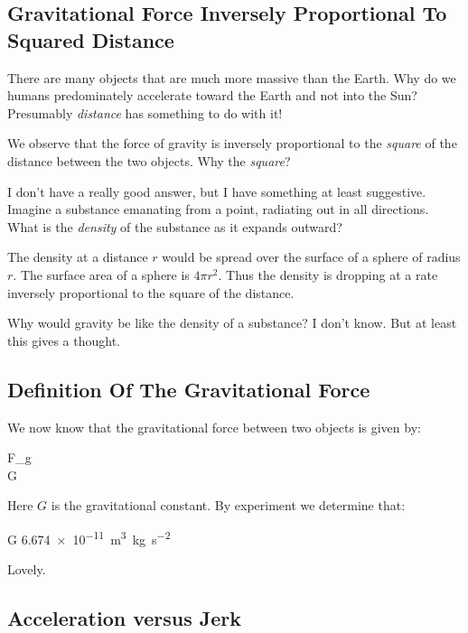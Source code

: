 \subsection{Gravitational Force Inversely Proportional To Squared Distance}

There are many objects that are much more massive than the Earth. Why do
we humans predominately accelerate toward the Earth and not into the
Sun? Presumably \emph{distance} has something to do with it!

We observe that the force of gravity is inversely proportional to the
\emph{square} of the distance between the two objects. Why the
\emph{square}?

I don't have a really good answer, but I have something at least
suggestive. Imagine a substance emanating from a point, radiating out in
all directions. What is the \emph{density} of the substance as it
expands outward?

The density at a distance $r$ would be spread over the surface of a
sphere of radius $r$. The surface area of a sphere is $4\pi r^2$. Thus
the density is dropping at a rate inversely proportional to the square
of the distance.

Why would gravity be like the density of a substance? I don't know. But
at least this gives a thought.

\subsection{Definition Of The Gravitational Force}

We now know that the gravitational force between two objects is given
by:

\begin{nedqn}
  F_g
\simcol
\\
\eqcol
  G
\end{nedqn}

Here $G$ is the gravitational constant. By experiment we determine that:

\begin{nedqn}
  G
\eqcol
  \SI{6.674e-11}{m^3.kg.s^{-2}}
\end{nedqn}

Lovely.

\subsection{Acceleration versus Jerk}

